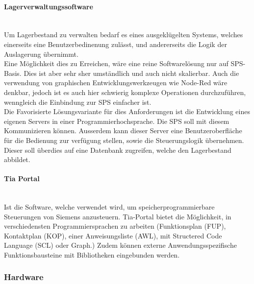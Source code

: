 \paragraph{Lagerverwaltungssoftware}\mbox{}\\
Um Lagerbestand zu verwalten bedarf es eines ausgeklügelten Systems, welches einerseits eine Benutzerbedinenung zulässt, und andererseits die Logik der Auslagerung übernimmt. \\
Eine Möglichkeit dies zu Erreichen, wäre eine reine Softwarelösung nur auf SPS-Basis. Dies ist aber sehr sher umständlich und auch nicht skalierbar. Auch die verwendung von graphischen Entwicklungswerkzeugen wie Node-Red wäre denkbar, jedoch ist es auch hier schwierig komplexe Operationen durchzuführen, wenngleich die Einbindung zur SPS einfacher ist.\\
Die Favorisierte Lösungsvariante für dies Anforderungen ist die Entwicklung eines eigenen Servers in einer Programmierhochsprache. Die SPS soll mit diesem Kommunizieren können. Ausserdem kann dieser Server eine Benutzeroberfläche für die Bedienung zur verfügung stellen, sowie die Steuerungslogik übernehmen. Dieser soll überdies auf eine Datenbank zugreifen, welche den Lagerbestand abbildet.


\paragraph{Tia Portal}\mbox{}\\
Ist die Software, welche verwendet wird, um speicherprogrammierbare Steuerungen von Siemens anzusteuern. Tia-Portal bietet die Möglichkeit, in verschiedensten Programmiersprachen zu arbeiten (Funktionsplan (FUP), Kontaktplan (KOP), einer Anweisungsliste (AWL), mit Structered Code Language (SCL) oder Graph.) Zudem können externe Anwendungsspezifische Funktionsbausteine mit Bibliotheken eingebunden werden.
\cite{TIA_Portal_Programmiersprachen}

\subsubsection{Hardware}
\nopagebreak
